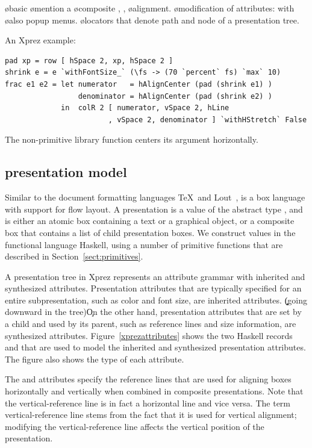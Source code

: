 \documentclass[12pt]{article}
\begin{document}
\bl
\o basic  
\o mention a 
\o composite , , 
\o alignment.
\o modification of attributes: with
\o also popup menus.
\o locators that denote path and node of a presentation tree.
\el

An Xprez example:

\begin{footnotesize}
\begin{verbatim}
pad xp = row [ hSpace 2, xp, hSpace 2 ]
shrink e = e `withFontSize_` (\fs -> (70 `percent` fs) `max` 10)
frac e1 e2 = let numerator   = hAlignCenter (pad (shrink e1) )
                 denominator = hAlignCenter (pad (shrink e2) )
             in  colR 2 [ numerator, vSpace 2, hLine
                        , vSpace 2, denominator ] `withHStretch` False
\end{verbatim}
\end{footnotesize}

The non-primitive library function  centers its argument horizontally.


\bc
%																
\subsection{{\Xprez} presentation model}

Similar to the document formatting languages \TeX ~and Lout~\cite{kingston93lout}, {\Xprez} is a box language with support for flow layout. A presentation is a value of the abstract type , and is either an atomic box containing a text or a graphical object, or a composite box that contains a list of child presentation boxes.  We construct  values in the functional language Haskell, using a number of primitive functions that are described in Section~\ref{sect:primitives}.


A presentation tree in {Xprez} represents an attribute grammar with inherited and synthesized attributes. Presentation attributes that are typically specified for an entire subpresentation, such as color and font size, are inherited attributes.  \b\c (going downward in the tree)\e\c On the other hand, presentation attributes that are set by a child and used by its parent, such as  reference lines and size information, are synthesized attributes. Figure~\ref{xprezattributes} shows the two Haskell records   and  that are used to model the inherited and synthesized presentation attributes. The figure also shows the type of each attribute. 

The  and  attributes specify the reference lines that are used for aligning boxes horizontally and vertically when combined in composite presentations. Note that the vertical-reference line is in fact a horizontal line and vice versa. The term vertical-reference line stems from the fact that it is used for vertical alignment; modifying the vertical-reference line affects the vertical position of the presentation. 
\end{document}
